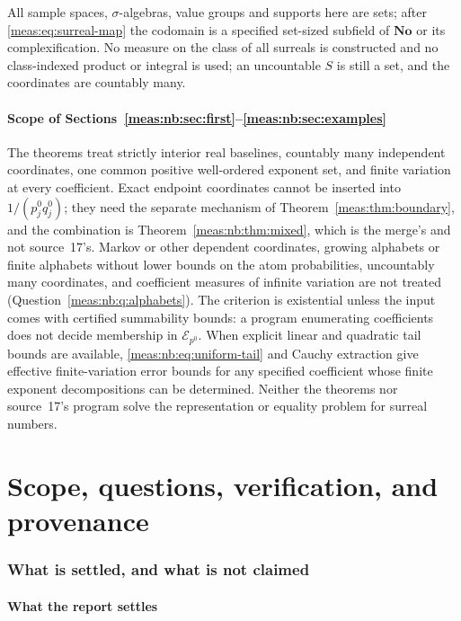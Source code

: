 \documentclass[11pt]{article}
\numberwithin{equation}{section}
\theoremstyle{definition}
\theoremstyle{remark}
\newcommand{\No}{\mathbf{No}}
\newcommand{\Erow}{\mathcal E_{p^0}}
\begin{document}
All sample spaces, $\sigma$-algebras, value groups and supports here are sets; after
\eqref{meas:eq:surreal-map} the codomain is a specified set-sized subfield of $\No$ or
its complexification. No measure on the class of all surreals is constructed and no
class-indexed product or integral is used; an uncountable $S$ is still a set, and the
coordinates are countably many.

\subsection{Scope of Sections~\ref{meas:nb:sec:first}--\ref{meas:nb:sec:examples}}
\label{meas:nb:sub:scope}

The theorems treat strictly interior real baselines, countably many independent
coordinates, one common positive well-ordered exponent set, and finite variation at
every coefficient. Exact endpoint coordinates cannot be inserted into
$1/(p_j^0q_j^0)$; they need the separate mechanism of
Theorem~\ref{meas:thm:boundary}, and the combination is
Theorem~\ref{meas:nb:thm:mixed}, which is the merge's and not source~17's. Markov or
other dependent coordinates, growing alphabets or finite alphabets without lower
bounds on the atom probabilities, uncountably many coordinates, and coefficient
measures of infinite variation are not treated
(Question~\ref{meas:nb:q:alphabets}). The criterion is existential unless the input
comes with certified summability bounds: a program enumerating coefficients does not
decide membership in $\Erow$. When explicit linear and quadratic tail bounds are
available, \eqref{meas:nb:eq:uniform-tail} and Cauchy extraction give effective
finite-variation error bounds for any specified coefficient whose finite exponent
decompositions can be determined. Neither the theorems nor source~17's program solve
the representation or equality problem for surreal numbers.

\part{Scope, questions, verification, and provenance}\label{meas:part:scope}

\section{What is settled, and what is not claimed}\label{meas:sec:scope}

\subsection{What the report settles}
\end{document}
